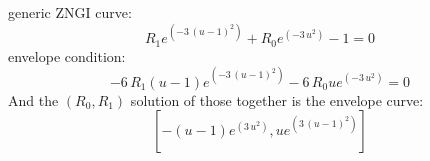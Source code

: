 \documentclass{article}
\begin{document}
generic ZNGI curve:
\[R_{1} e^{\left(-3 \, {\left(u - 1\right)}^{2}\right)} + R_{0} e^{\left(-3 \, u^{2}\right)} - 1 = 0\]
envelope condition:
\[-6 \, R_{1} {\left(u - 1\right)} e^{\left(-3 \, {\left(u - 1\right)}^{2}\right)} - 6 \, R_{0} u e^{\left(-3 \, u^{2}\right)} = 0\]
And the $(R_0,R_1)$ solution of those together is the envelope curve:
\[\left[-{\left(u - 1\right)} e^{\left(3 \, u^{2}\right)}, u e^{\left(3 \, {\left(u - 1\right)}^{2}\right)}\right]\]
\end{document}
